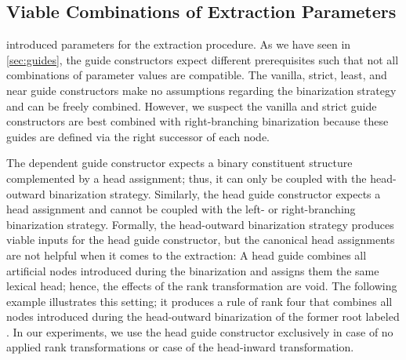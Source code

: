 \documentclass[../../document.tex]{subfiles}
\begin{document}

    \subsection{Viable Combinations of Extraction Parameters}\label{sec:viable-paramters}
     introduced parameters for the extraction procedure.
    As we have seen in \cref{sec:guides}, the guide constructors expect different prerequisites such that not all combinations of parameter values are compatible.
    The vanilla, strict, least, and near guide constructors make no assumptions regarding the binarization strategy and can be freely combined.
    However, we suspect the vanilla and strict guide constructors are best combined with right-branching binarization because these guides are defined via the right successor of each node.
    
    The dependent guide constructor expects a binary constituent structure complemented by a head assignment; thus, it can only be coupled with the head-outward binarization strategy.
    Similarly, the head guide constructor expects a head assignment and cannot be coupled with the left- or right-branching binarization strategy.
    Formally, the head-outward binarization strategy produces viable inputs for the head guide constructor, but the canonical head assignments are not helpful when it comes to the extraction:
        A head guide combines all artificial nodes introduced during the binarization and assigns them the same lexical head; hence, the effects of the rank transformation are void.
    The following example illustrates this setting; it produces a rule of rank four that combines all nodes introduced during the head-outward binarization of the former root labeled .
    In our experiments, we use the head guide constructor exclusively in case of no applied rank transformations or case of the head-inward transformation.
\end{document}
